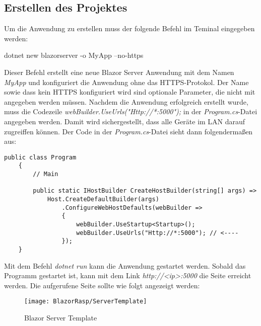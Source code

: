 \subsection{Erstellen des Projektes}
\label{subsec:erstellenProject}
Um die Anwendung zu erstellen muss der folgende Befehl im Teminal
eingegeben werden:

\begin{zitat}
    dotnet new blazorserver -o MyApp --no-https
\end{zitat}

Dieser Befehl erstellt eine neue Blazor Server Anwendung mit dem Namen \emph{MyApp} und
konfiguriert die Anwendung ohne das HTTPS-Protokol. Der Name sowie dass kein HTTPS konfiguriert
wird sind optionale Parameter, die nicht mit angegeben werden müssen. Nachdem die Anwendung
erfolgreich erstellt wurde, muss die Codezeile \emph{webBuilder.UseUrls("Http://*:5000");
} in der \emph{Program.cs}-Datei angegeben werden. Damit wird sichergestellt, dass alle Geräte im
LAN darauf zugreiffen können. Der Code in der \emph{Program.cs}-Datei sieht dann folgendermaßen aus:

\begin{lstlisting}[language={[Sharp]C}, caption=Program.cs Code,
    label=lst:programCsCode]
    public class Program
    {
        // Main

        public static IHostBuilder CreateHostBuilder(string[] args) =>
            Host.CreateDefaultBuilder(args)
                .ConfigureWebHostDefaults(webBuilder =>
                {
                    webBuilder.UseStartup<Startup>();
                    webBuilder.UseUrls("Http://*:5000"); // <----
                });
    }
\end{lstlisting}

Mit dem Befehl \emph{dotnet run} kann die Anwendung gestartet werden. Sobald das Programm
gestartet ist, kann mit dem Link \emph{http://<ip>:5000} die Seite erreicht werden. Die
aufgerufene Seite sollte wie folgt angezeigt werden:

\begin{figure}[h]
    \centering
    \texttt{[image: BlazorRasp/ServerTemplate]}
    \caption[Blazor Server Template]{Blazor Server Template}
    \label{img:BlazorServerTemplate}
\end{figure}